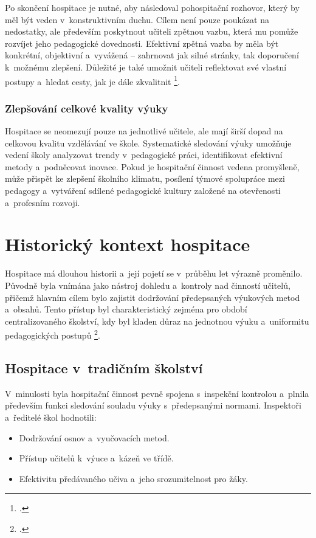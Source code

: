 Po skončení hospitace je nutné, aby následoval pohospitační rozhovor, který by měl být veden v~konstruktivním duchu. Cílem není pouze poukázat na nedostatky, ale především poskytnout učiteli zpětnou vazbu, která mu pomůže rozvíjet jeho pedagogické dovednosti. Efektivní zpětná vazba by měla být konkrétní, objektivní a~vyvážená – zahrnovat jak silné stránky, tak doporučení k~možnému zlepšení. Důležité je také umožnit učiteli reflektovat své vlastní postupy a~hledat cesty, jak je dále zkvalitnit \footcite[11]{rozvijejici-hospitace}. 

\subsubsection{Zlepšování celkové kvality výuky}

Hospitace se neomezují pouze na jednotlivé učitele, ale mají širší dopad na celkovou kvalitu vzdělávání ve škole. Systematické sledování výuky umožňuje vedení školy analyzovat trendy v~pedagogické práci, identifikovat efektivní metody a~podněcovat inovace. Pokud je hospitační činnost vedena promyšleně, může přispět ke zlepšení školního klimatu, posílení týmové spolupráce mezi pedagogy a~vytváření sdílené pedagogické kultury založené na otevřenosti a~profesním rozvoji.


\section{Historický kontext hospitace}

Hospitace má dlouhou historii a~její pojetí se v~průběhu let výrazně proměnilo. Původně byla vnímána jako nástroj dohledu a~kontroly nad činností učitelů, přičemž hlavním cílem bylo zajistit dodržování předepsaných výukových metod a~obsahů. Tento přístup byl charakteristický zejména pro období centralizovaného školství, kdy byl kladen důraz na jednotnou výuku a~uniformitu pedagogických postupů \footcite[119]{ped-proces-rizeni}.

\subsection{Hospitace v~tradičním školství}

V~minulosti byla hospitační činnost pevně spojena s~inspekční kontrolou a~plnila především funkci sledování souladu výuky s~předepsanými normami. Inspektoři a~ředitelé škol hodnotili:

\begin{itemize}
    \item Dodržování osnov a~vyučovacích metod.

    \item Přístup učitelů k~výuce a~kázeň ve třídě.
    
    \item Efektivitu předávaného učiva a~jeho srozumitelnost pro žáky.    
\end{itemize}

